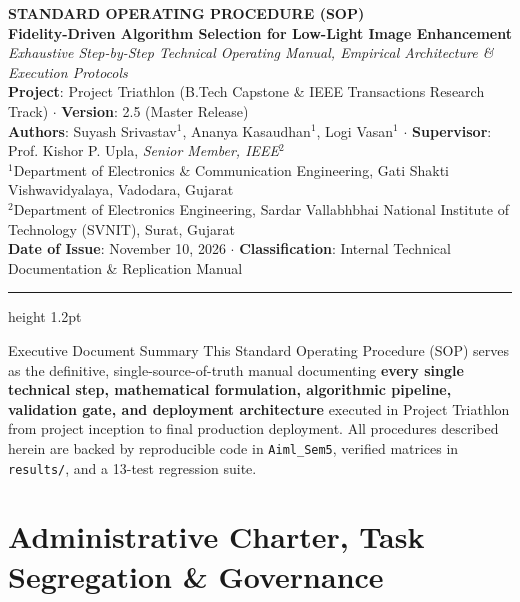 \documentclass[10pt,a4paper]{article}
\begin{document}
\begin{center}
    {\LARGE\bfseries\color{primaryblue} STANDARD OPERATING PROCEDURE (SOP)}\\[4pt]
    {\large\bfseries Fidelity-Driven Algorithm Selection for Low-Light Image Enhancement}\\[3pt]
    {\normalsize\itshape Exhaustive Step-by-Step Technical Operating Manual, Empirical Architecture \& Execution Protocols}\\[6pt]
    \small
    \textbf{Project}: Project Triathlon (B.Tech Capstone \& IEEE Transactions Research Track) $\cdot$ \textbf{Version}: 2.5 (Master Release)\\
    \textbf{Authors}: Suyash Srivastav$^1$, Ananya Kasaudhan$^1$, Logi Vasan$^1$ $\cdot$ \textbf{Supervisor}: Prof. Kishor P. Upla, \textit{Senior Member, IEEE}$^2$\\
    $^1$Department of Electronics \& Communication Engineering, Gati Shakti Vishwavidyalaya, Vadodara, Gujarat\\
    $^2$Department of Electronics Engineering, Sardar Vallabhbhai National Institute of Technology (SVNIT), Surat, Gujarat\\
    \textbf{Date of Issue}: November 10, 2026 $\cdot$ \textbf{Classification}: Internal Technical Documentation \& Replication Manual
\end{center}

\vspace{-4pt}
\hrule height 1.2pt
\vspace{8pt}

\begin{calloutbox}{Executive Document Summary}
This Standard Operating Procedure (SOP) serves as the definitive, single-source-of-truth manual documenting \textbf{every single technical step, mathematical formulation, algorithmic pipeline, validation gate, and deployment architecture} executed in Project Triathlon from project inception to final production deployment. All procedures described herein are backed by reproducible code in \texttt{Aiml\_Sem5}, verified matrices in \texttt{results/}, and a 13-test regression suite.
\end{calloutbox}

\section{Administrative Charter, Task Segregation \& Governance}
\end{document}
